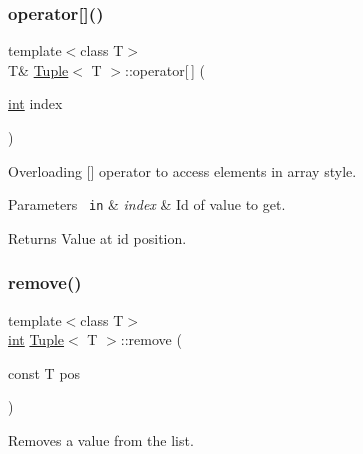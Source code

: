 \mbox{\label{class_tuple_ae18a93053af932997709798b3fd5d12d}} 
\subsubsection{\texorpdfstring{operator[]()}{operator[]()}}
{\footnotesize\ttfamily template$<$class T$>$ \\
T\& \mbox{\hyperlink{class_tuple}{Tuple}}$<$ T $>$\+::operator\mbox{[}$\,$\mbox{]} (\begin{DoxyParamCaption}\item[{\mbox{\hyperlink{draw_8hh_aa620a13339ac3a1177c86edc549fda9b}{int}}}]{index }\end{DoxyParamCaption})\hspace{0.3cm}{\ttfamily [inline]}}



Overloading \mbox{[}\mbox{]} operator to access elements in array style. 


\begin{DoxyParams}[1]{Parameters}
\mbox{\texttt{ in}}  & {\em index} & Id of value to get. \\
\hline
\end{DoxyParams}
\begin{DoxyReturn}{Returns}
Value at id position. 
\end{DoxyReturn}
\mbox{\label{class_tuple_a53a1abc3017d30cf1a6d6858caee8ce8}} 
\subsubsection{\texorpdfstring{remove()}{remove()}}
{\footnotesize\ttfamily template$<$class T$>$ \\
\mbox{\hyperlink{draw_8hh_aa620a13339ac3a1177c86edc549fda9b}{int}} \mbox{\hyperlink{class_tuple}{Tuple}}$<$ T $>$\+::remove (\begin{DoxyParamCaption}\item[{const T}]{pos }\end{DoxyParamCaption})\hspace{0.3cm}{\ttfamily [inline]}}



Removes a value from the list. 


